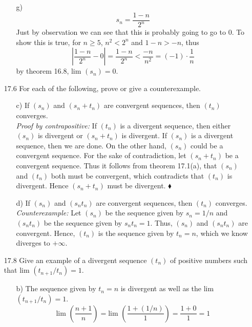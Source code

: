 \documentclass[12pt]{article}
\begin{document}
\begin{enumerate}
\begin{enumerate}
\item[g)] 
\[
s_n = \frac{1 - n}{2^n}
\]
Just by observation we can see that this is probably going to go to $0$. 
To show this is true, for $n \geq 5$, $n^2 < 2^n$ and $1 - n > -n$, thus
\[
\left| \frac{1 - n}{2^n} - 0 \right| = \frac{1 - n}{2^n} < \frac{-n}{n^2} = (-1) \cdot \frac{1}{n}
\]
by theorem 16.8, lim $(s_n) = 0$.

\end{enumerate}

\item[17.6] For each of the following, prove or give a counterexample.
\begin{enumerate}
\item[c)] If $(s_n)$ and $(s_n + t_n)$ are convergent sequences, then $(t_n)$ converges. \\
\emph{Proof by contrapositive:} If $(t_n)$ is a divergent sequence, then either $(s_n)$ is 
divergent or $(s_n + t_n)$ is divergent. If $(s_n)$ is a divergent sequence, then we are done.
On the other hand, $(s_n)$ could be a convergent sequence. For the sake of contradiction, let
$(s_n + t_n)$ be a convergent sequence. Thus it follows from theorem 17.1(a), that $(s_n)$ and
$(t_n)$ both must be convergent, which contradicts that $(t_n)$ is divergent. Hence
$(s_n + t_n)$ must be divergent. $\blacklozenge$

\item[d)] If $(s_n)$ and $(s_nt_n)$ are convergent sequences, then $(t_n)$ converges. \\
\emph{Counterexample:} Let $(s_n)$ be the sequence given by $s_n = 1/n$ 
and $(s_nt_n)$ be the sequence given by $s_nt_n = 1$. Thus, $(s_n)$ and $(s_nt_n)$
are convergent. Hence, $(t_n)$ is the sequence given by $t_n = n$, 
which we know diverges to $+\infty$.
\end{enumerate}

\item[17.8] Give an example of a divergent sequence $(t_n)$ of positive numbers such that lim $(t_{n+1}/t_n) = 1$.
\begin{enumerate}
\item[b)] The sequence given by $t_n = n$ is divergent as well as the lim $(t_{n+1}/t_n) = 1$.
\[
\mbox{lim } \left( \frac{n + 1}{n} \right) = \mbox{lim } \left( \frac{1 + (1/n)}{1} \right) =
\frac{1 + 0}{1} = 1
\]
\end{enumerate}


\end{enumerate}
\end{document}
